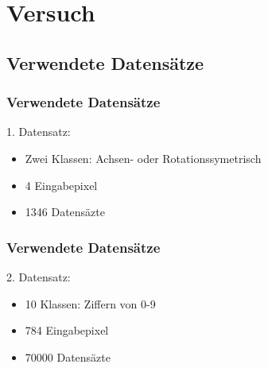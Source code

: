 \documentclass[12pt,titlepage]{beamer}
\begin{document}
	\section{Versuch}
	\subsection{Verwendete Datensätze}
	\begin{frame}
	\frametitle{Verwendete Datensätze}
	1. Datensatz: 
	\begin{itemize}
	\item Zwei Klassen: Achsen- oder Rotationssymetrisch
	\item 4 Eingabepixel
	\item 1346 Datensäzte
	\end{itemize}
	\end{frame}
	\begin{frame}
	\frametitle{Verwendete Datensätze}
	2. Datensatz: 
	\begin{itemize}
	\item 10 Klassen: Ziffern von 0-9
	\item 784 Eingabepixel
	\item 70000 Datensäzte
	\end{itemize}
	\end{frame}
\end{document}
